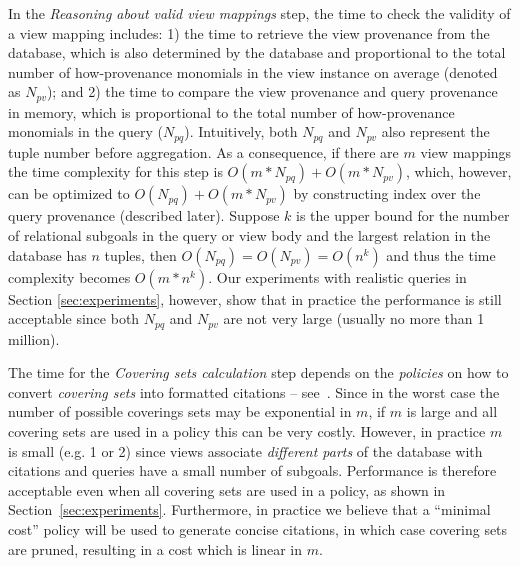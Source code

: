 In the {\em Reasoning about valid view mappings} step, 
the time to check the validity of a view mapping includes: 1) the time to retrieve the view provenance from the database, which is also determined by the database and proportional to the total number of how-provenance monomials in the view instance on average (denoted as $N_{pv}$); and 2) the time to compare the view provenance and query provenance in memory, which is proportional to the total number of how-provenance monomials in the query ($N_{pq}$). Intuitively, both $N_{pq}$ and $N_{pv}$ also represent the tuple number before aggregation. As a consequence, if there are $m$ view mappings the time complexity for this step is $O(m*N_{pq}) + O(m*N_{pv})$, which, however, can be optimized to $O(N_{pq}) + O(m*N_{pv})$ by constructing index over the query provenance (described later). Suppose $k$ is the upper bound for the number of relational subgoals in the query or view body and the largest relation in the database has $n$ tuples, then $O(N_{pq}) = O(N_{pv}) = O(n^k)$ and thus the time complexity becomes $O(m*n^k)$.  Our experiments with realistic queries in Section \ref{sec:experiments}\eat{~\ref{ssec: realistic}}, however, show that in practice the performance is still acceptable since both $N_{pq}$ and $N_{pv}$ are not very large (usually no more than 1 million).


The time for the {\em Covering sets calculation} step depends on the {\em policies} on how to convert {\em covering sets} into formatted citations
-- see~\cite{wu2018data}.  
Since in the worst case the number of possible coverings sets may be exponential in $m$, if $m$ is large and all covering sets are used in a policy this can be very costly.  
However, in practice $m$ is small (e.g. 1 or 2) since views associate \textit{different parts} of the database with citations and queries have a small number of subgoals. Performance is therefore acceptable even when all covering sets are used in a policy, as shown in Section~\ref{sec:experiments}.  Furthermore, in practice we believe that a ``minimal cost'' policy will be used to generate concise citations, in which case covering sets are pruned,  resulting in a cost which is linear in $m$.


